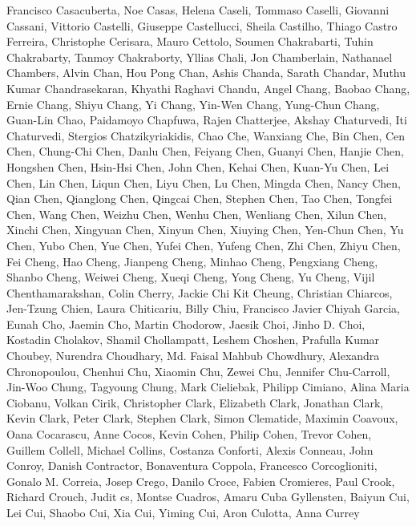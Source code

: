 \documentclass[11pt]{article}
\begin{document}
\begin{description}[itemsep=4mm, style=nextline]
Francisco Casacuberta, 
Noe Casas, 
Helena Caseli, 
Tommaso Caselli, 
Giovanni Cassani, 
Vittorio Castelli, 
Giuseppe Castellucci, 
Sheila Castilho, 
Thiago Castro Ferreira, 
Christophe Cerisara, 
Mauro Cettolo, 
Soumen Chakrabarti, 
Tuhin Chakrabarty, 
Tanmoy Chakraborty, 
Yllias Chali, 
Jon Chamberlain, 
Nathanael Chambers, 
Alvin Chan, 
Hou Pong Chan, 
Ashis Chanda, 
Sarath Chandar, 
Muthu Kumar Chandrasekaran, 
Khyathi Raghavi Chandu, 
Angel Chang, 
Baobao Chang, 
Ernie Chang, 
Shiyu Chang, 
Yi Chang, 
Yin-Wen Chang, 
Yung-Chun Chang, 
Guan-Lin Chao, 
Paidamoyo Chapfuwa, 
Rajen Chatterjee, 
Akshay Chaturvedi, 
Iti Chaturvedi, 
Stergios Chatzikyriakidis, 
Chao Che, 
Wanxiang Che, 
Bin Chen, 
Cen Chen, 
Chung-Chi Chen, 
Danlu Chen, 
Feiyang Chen, 
Guanyi Chen, 
Hanjie Chen, 
Hongshen Chen, 
Hsin-Hsi Chen, 
John Chen, 
Kehai Chen, 
Kuan-Yu Chen, 
Lei Chen, 
Lin Chen, 
Liqun Chen, 
Liyu Chen, 
Lu Chen, 
Mingda Chen, 
Nancy Chen, 
Qian Chen, 
Qianglong Chen, 
Qingcai Chen, 
Stephen Chen, 
Tao Chen, 
Tongfei Chen, 
Wang Chen, 
Weizhu Chen, 
Wenhu Chen, 
Wenliang Chen, 
Xilun Chen, 
Xinchi Chen, 
Xingyuan Chen, 
Xinyun Chen, 
Xiuying Chen, 
Yen-Chun Chen, 
Yu Chen, 
Yubo Chen, 
Yue Chen, 
Yufei Chen, 
Yufeng Chen, 
Zhi Chen, 
Zhiyu Chen, 
Fei Cheng, 
Hao Cheng, 
Jianpeng Cheng, 
Minhao Cheng, 
Pengxiang Cheng, 
Shanbo Cheng, 
Weiwei Cheng, 
Xueqi Cheng, 
Yong Cheng, 
Yu Cheng, 
Vijil Chenthamarakshan, 
Colin Cherry, 
Jackie Chi Kit Cheung, 
Christian Chiarcos, 
Jen-Tzung Chien, 
Laura Chiticariu, 
Billy Chiu, 
Francisco Javier Chiyah Garcia, 
Eunah Cho, 
Jaemin Cho, 
Martin Chodorow, 
Jaesik Choi, 
Jinho D. Choi, 
Kostadin Cholakov, 
Shamil Chollampatt, 
Leshem Choshen, 
Prafulla Kumar Choubey, 
Nurendra Choudhary, 
Md. Faisal Mahbub Chowdhury, 
Alexandra Chronopoulou, 
Chenhui Chu, 
Xiaomin Chu, 
Zewei Chu, 
Jennifer Chu-Carroll, 
Jin-Woo Chung, 
Tagyoung Chung, 
Mark Cieliebak, 
Philipp Cimiano, 
Alina Maria Ciobanu, 
Volkan Cirik, 
Christopher Clark, 
Elizabeth Clark, 
Jonathan Clark, 
Kevin Clark, 
Peter Clark, 
Stephen Clark, 
Simon Clematide, 
Maximin Coavoux, 
Oana Cocarascu, 
Anne Cocos, 
Kevin Cohen, 
Philip Cohen, 
Trevor Cohen, 
Guillem Collell, 
Michael Collins, 
Costanza Conforti, 
Alexis Conneau, 
John Conroy, 
Danish Contractor, 
Bonaventura Coppola, 
Francesco Corcoglioniti, 
Gonalo M. Correia, 
Josep Crego, 
Danilo Croce, 
Fabien Cromieres, 
Paul Crook, 
Richard Crouch, 
Judit cs, 
Montse Cuadros, 
Amaru Cuba Gyllensten, 
Baiyun Cui, 
Lei Cui, 
Shaobo Cui, 
Xia Cui, 
Yiming Cui, 
Aron Culotta, 
Anna Currey
\\

\end{description}
\end{document}
